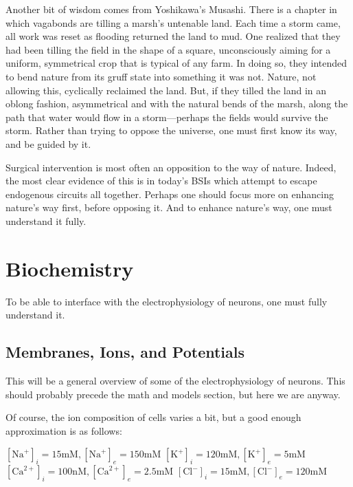 \documentclass[12pt]{report}
\begin{document}
Another bit of wisdom comes from Yoshikawa's Musashi. There is a chapter in which vagabonds are tilling a marsh's untenable land. Each time a storm came, all work was reset as flooding returned the land to mud. One realized that they had been tilling the field in the shape of a square, unconsciously aiming for a uniform, symmetrical crop that is typical of any farm. In doing so, they intended to bend nature from its gruff state into something it was not. Nature, not allowing this, cyclically reclaimed the land. But, if they tilled the land in an oblong fashion, asymmetrical and with the natural bends of the marsh, along the path that water would flow in a storm---perhaps the fields would survive the storm. Rather than trying to oppose the universe, one must first know its way, and be guided by it.\newline

Surgical intervention is most often an opposition to the way of nature. Indeed, the most clear evidence of this is in today's BSIs which attempt to escape endogenous circuits all together. Perhaps one should focus more on enhancing nature's way first, before opposing it. And to enhance nature's way, one must understand it fully. 

\chapter{Biochemistry}

To be able to interface with the electrophysiology of neurons, one must fully understand it. 

\section{Membranes, Ions, and Potentials}

This will be a general overview of some of the electrophysiology of neurons. This should probably precede the math and models section, but here we are anyway.\newline

Of course, the ion composition of cells varies a bit, but a good enough approximation is as follows:\newline 


\hspace*{0.1in} $[\mathrm{Na}^+]_i = 15\mathrm{mM}, [\mathrm{Na}^+]_e = 150\mathrm{mM}$\newline
\hspace*{0.1in} $[\mathrm{K}^+]_i = 120\mathrm{mM}, [\mathrm{K}^+]_e = 5\mathrm{mM}$ \newline
\hspace*{0.1in} $[\mathrm{Ca}^{2+}]_i = 100\mathrm{nM}, 
[\mathrm{Ca}^{2+}]_e = 2.5\mathrm{mM}$\newline
\hspace*{0.1in} $[\mathrm{Cl}^-]_i = 15\mathrm{mM}, [\mathrm{Cl}^-]_e = 120\mathrm{mM}$ 
\newline
\end{document}
